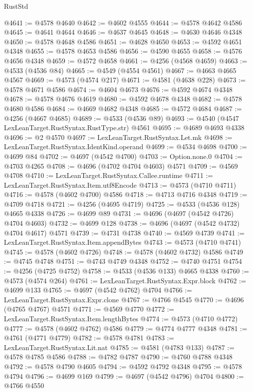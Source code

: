 \begin{lexlean}{RustStd}
\begin{coremodule}
@4641 := @4578 @4640
@4642 := @4602 @4555
@4644 := @4578 @4642 @4586
@4645 := @4641 @4644
@4646 := @4637 @4645
@4648 := @4630 @4646 @4348
@4650 := @4578 @4648 @4586
@4651 := @4628 @4650
@4653 := @4592 @4651 @4348
@4655 := @4578 @4653 @4586
@4656 := @4590 @4655
@4658 := @4576 @4656 @4348
@4659 := @4572 @4658
@4661 := @4256 (@4568 @4659)
@4663 := @4533 (@4536 @84)
@4665 := @4549 (@4554 @4561)
@4667 := @4663 @4665 @4567
@4669 := @4573 (@4574 @217)
@4671 := @4581 (@4638 @228)
@4673 := @4578 @4671 @4586
@4674 := @4604 @4673
@4676 := @4592 @4674 @4348
@4678 := @4578 @4676 @4619
@4680 := @4592 @4678 @4348
@4682 := @4578 @4680 @4586
@4684 := @4669 @4682 @4348
@4685 := @4572 @4684
@4687 := @4256 (@4667 @4685)
@4689 := @4533 (@4536 @89)
@4693 := @4540 (@4547 LexLeanTarget.RustSyntax.RustType.str) @4561
@4695 := @4689 @4693 @4338
@4696 := @2 @4570
@4697 := LexLeanTarget.RustSyntax.Let.mk
@4698 := LexLeanTarget.RustSyntax.IdentKind.operand
@4699 := @4534 @4698
@4700 := @4699 @84
@4702 := @4697 (@4542 @4700)
@4703 := Option.none.{0}
@4704 := @4703 @4265
@4708 := @4696 (@4702 @4704 @4603) @4571
@4709 := @4569 @4708
@4710 := LexLeanTarget.RustSyntax.Callee.runtime
@4711 := LexLeanTarget.RustSyntax.Item.utf8Encode
@4713 := @4573 (@4710 @4711)
@4716 := @4578 (@4602 @4700) @4586
@4718 := @4713 @4716 @4348
@4719 := @4709 @4718
@4721 := @4256 (@4695 @4719)
@4725 := @4533 (@4536 @128) @4665 @4338
@4726 := @4699 @89
@4731 := @4696 (@4697 (@4542 @4726) @4704 @4603)
@4732 := @4699 @128
@4738 := @4696 (@4697 (@4542 @4732) @4704 @4617) @4571
@4739 := @4731 @4738
@4740 := @4569 @4739
@4741 := LexLeanTarget.RustSyntax.Item.appendBytes
@4743 := @4573 (@4710 @4741)
@4745 := @4578 (@4602 @4726)
@4748 := @4578 (@4602 @4732) @4586
@4749 := @4745 @4748
@4751 := @4743 @4749 @4348
@4752 := @4740 @4751
@4754 := @4256 (@4725 @4752)
@4758 := @4533 (@4536 @133) @4665 @4338
@4760 := @4573 (@4574 @264)
@4761 := LexLeanTarget.RustSyntax.Expr.block
@4762 := @4699 @133
@4765 := @4697 (@4542 @4762) @4704
@4766 := LexLeanTarget.RustSyntax.Expr.clone
@4767 := @4766 @4545
@4770 := @4696 (@4765 @4767) @4571
@4771 := @4569 @4770
@4772 := LexLeanTarget.RustSyntax.Item.lengthBytes
@4774 := @4573 (@4710 @4772)
@4777 := @4578 (@4602 @4762) @4586
@4779 := @4774 @4777 @4348
@4781 := @4761 (@4771 @4779)
@4782 := @4578 @4781
@4783 := LexLeanTarget.RustSyntax.Lit.nat
@4785 := @4581 (@4783 @133)
@4787 := @4578 @4785 @4586
@4788 := @4782 @4787
@4790 := @4760 @4788 @4348
@4792 := @4578 @4790 @4605
@4794 := @4592 @4792 @4348
@4795 := @4578 @4794
@4796 := @4699 @169
@4799 := @4697 (@4542 @4796) @4704
@4800 := @4766 @4550

\end{coremodule}
\end{lexlean}
